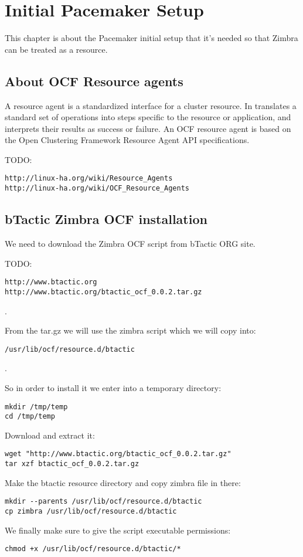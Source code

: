 

\chapter{Initial Pacemaker Setup}
This chapter is about the Pacemaker initial setup that it's needed so that Zimbra can be treated as a resource.

\section {About OCF Resource agents}
A resource agent is a standardized interface for a cluster resource. In translates a standard set of operations into steps specific to the resource or application, and interprets their results as success or failure. An OCF resource agent is based on the Open Clustering Framework Resource Agent API specifications. 

TODO:
\begin{verbatim}
http://linux-ha.org/wiki/Resource_Agents
http://linux-ha.org/wiki/OCF_Resource_Agents
\end{verbatim}



\section {bTactic Zimbra OCF installation}
We need to download the Zimbra OCF script from bTactic ORG site.

TODO:
\begin{verbatim}
http://www.btactic.org
http://www.btactic.org/btactic_ocf_0.0.2.tar.gz
\end{verbatim}
.

From the tar.gz we will use the zimbra script which we will copy into:
\begin{verbatim}
/usr/lib/ocf/resource.d/btactic
\end{verbatim}
.

So in order to install it we enter into a temporary directory:
\begin{verbatim}
mkdir /tmp/temp
cd /tmp/temp
\end{verbatim}
Download and extract it:
\begin{verbatim}
wget "http://www.btactic.org/btactic_ocf_0.0.2.tar.gz"
tar xzf btactic_ocf_0.0.2.tar.gz
\end{verbatim}
Make the btactic resource directory and copy zimbra file in there:
\begin{verbatim}
mkdir --parents /usr/lib/ocf/resource.d/btactic
cp zimbra /usr/lib/ocf/resource.d/btactic
\end{verbatim}
We finally make sure to give the script executable permissions:
\begin{verbatim}
chmod +x /usr/lib/ocf/resource.d/btactic/*
\end{verbatim}

